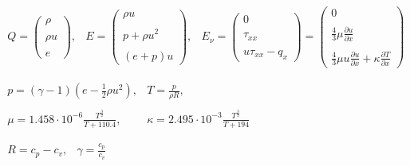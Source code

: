 \documentclass[11pt, a4paper]{article}
\begin{document}
\begin{equation}
    \begin{array}{c}
        \begin{matrix}
            Q=\begin{pmatrix}
                \rho \\\\
                \rho u \\\\
                e
            \end{pmatrix}, & E=\begin{pmatrix}
                \rho u \\\\
                p+\rho u^2 \\\\
                \left(e+p\right)u
            \end{pmatrix}, & E_\nu=\begin{pmatrix}
                0 \\\\
                \tau_{xx} \\\\
                u\tau_{xx}-q_x
            \end{pmatrix}=\begin{pmatrix}
                0 \\\\
                \displaystyle\frac{4}{3}\mu\frac{\partial u}{\partial x} \\\\
                \displaystyle\frac{4}{3}\mu u\frac{\partial u}{\partial x}+\kappa\frac{\partial T}{\partial x}
            \end{pmatrix}
        \end{matrix} \\\\
        \begin{matrix}
            \displaystyle p=\left(\gamma-1\right)\left(e-\frac{1}{2}\rho u^2\right), & \displaystyle T=\frac{p}{\rho R}, \\\\
            \displaystyle\mu=1.458\cdot10^{-6}\frac{T^{\frac{3}{2}}}{T+110.4}, & \displaystyle\kappa=2.495\cdot10^{-3}\frac{T^{\frac{3}{2}}}{T+194}
        \end{matrix} \\\\
        \begin{matrix}
            R=c_p-c_v, & \displaystyle\gamma=\frac{c_p}{c_v}
        \end{matrix}
    \end{array}
    \label{eq: definitions}
\end{equation}
\end{document}
